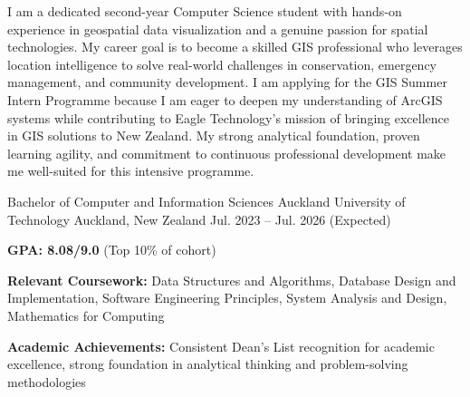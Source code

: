 \documentclass[11pt, a4paper]{awesome-cv}
\begin{document}
\makecvheader[C]

\begin{cvparagraph}
I am a dedicated second-year Computer Science student with hands-on experience in geospatial data visualization and a genuine passion for spatial technologies. My career goal is to become a skilled GIS professional who leverages location intelligence to solve real-world challenges in conservation, emergency management, and community development. I am applying for the GIS Summer Intern Programme because I am eager to deepen my understanding of ArcGIS systems while contributing to Eagle Technology's mission of bringing excellence in GIS solutions to New Zealand. My strong analytical foundation, proven learning agility, and commitment to continuous professional development make me well-suited for this intensive programme.
\end{cvparagraph}

\begin{cventries}
  \cventry
    {Bachelor of Computer and Information Sciences} %
    {Auckland University of Technology} %
    {Auckland, New Zealand} %
    {Jul. 2023 -- Jul. 2026 (Expected)} %
    {
      \begin{cvitems}
        \item {\textbf{GPA: 8.08/9.0} (Top 10\% of cohort)}
        \item {\textbf{Relevant Coursework:} Data Structures and Algorithms, Database Design and Implementation, Software Engineering Principles, System Analysis and Design, Mathematics for Computing}
        \item {\textbf{Academic Achievements:} Consistent Dean's List recognition for academic excellence, strong foundation in analytical thinking and problem-solving methodologies}
      \end{cvitems}
    }
\end{cventries}

\begin{cvskills}
\end{cvskills}
\end{document}
